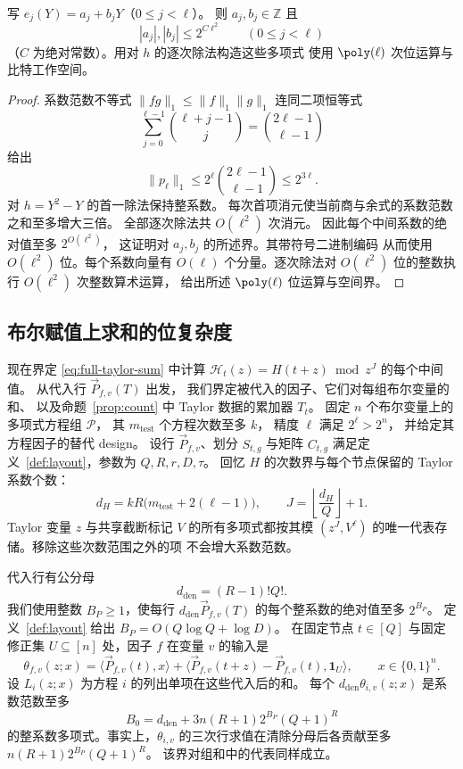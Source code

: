 \begin{lemma}\label{lem:rational-lift-height}
写 $e_j(Y)=a_j+b_jY$（$0\le j<\ell$）。
则 $a_j,b_j\in\mathbb Z$ 且
\[
 |a_j|,|b_j|\le2^{C\ell^2}\qquad(0\le j<\ell)
\]
（$C$ 为绝对常数）。用对 $h$ 的逐次除法构造这些多项式
使用 $\poly(\ell)$ 次位运算与比特工作空间。
\end{lemma}
\begin{proof}
系数范数不等式 $\|fg\|_1\le\|f\|_1\|g\|_1$
连同二项恒等式
\[
 \sum_{j=0}^{\ell-1}\binom{\ell+j-1}{j}
 =\binom{2\ell-1}{\ell-1}
\]
给出
\[
 \|p_\ell\|_1\le2^\ell\binom{2\ell-1}{\ell-1}\le2^{3\ell}.
\]
对 $h=Y^2-Y$ 的首一除法保持整系数。
每次首项消元使当前商与余式的系数范数之和至多增大三倍。
全部逐次除法共 $O(\ell^2)$ 次消元。
因此每个中间系数的绝对值至多 $2^{O(\ell^2)}$，
这证明对 $a_j,b_j$ 的所述界。其带符号二进制编码
从而使用 $O(\ell^2)$ 位。每个系数向量有 $O(\ell)$
个分量。逐次除法对 $O(\ell^2)$ 位的整数执行
$O(\ell^2)$ 次整数算术运算，
给出所述 $\poly(\ell)$ 位运算与空间界。
\end{proof}

\subsection{布尔赋值上求和的位复杂度}
\label{subsec:rational-streaming-height}
现在界定 \eqref{eq:full-taylor-sum} 中计算
$\mathcal H_t(z)=H(t+z)\bmod z^J$ 的每个中间值。
从代入行 $\vec{P}_{f,v}(T)$ 出发，
我们界定被代入的因子、它们对每组布尔变量的和、
以及命题~\ref{prop:count} 中 Taylor 数据的累加器
$T_t$。
固定 $n$ 个布尔变量上的多项式方程组 $\mathcal P$，
其 $m_{\mathrm{test}}$ 个方程次数至多 $k$，
精度 $\ell$ 满足 $2^\ell>2^n$，
并给定其方程因子的替代 design。
设行 $\vec{P}_{f,v}$、划分 $S_{t,g}$ 与矩阵 $C_{t,g}$
满足定义~\ref{def:layout}，参数为 $Q,R,r,D,\tau$。
回忆 $H$ 的次数界与每个节点保留的 Taylor
系数个数：
\[
 d_H=kR\bigl(m_{\mathrm{test}}+2(\ell-1)\bigr),\qquad
 J=\left\lfloor\frac{d_H}{Q}\right\rfloor+1.
\]
Taylor 变量 $z$ 与共享截断标记 $V$
的所有多项式都按其模 $(z^J,V^\ell)$
的唯一代表存储。移除这些次数范围之外的项
不会增大系数范数。

代入行有公分母
\[
 d_{\mathrm{den}}=(R-1)!Q!.
\]
我们使用整数 $B_P\ge1$，使每行
$d_{\mathrm{den}}\vec{P}_{f,v}(T)$
的每个整系数的绝对值至多 $2^{B_P}$。
定义~\ref{def:layout} 给出
$B_P=O(Q\log Q+\log D)$。
在固定节点 $t\in[Q]$ 与固定修正集 $U\subseteq[n]$
处，因子 $f$ 在变量 $v$ 的输入是
\[
 \theta_{f,v}(z;x)=\langle \vec{P}_{f,v}(t), x\rangle+
       \bigl\langle \vec{P}_{f,v}(t+z)-\vec{P}_{f,v}(t),\mathbf1_U\bigr\rangle,
 \qquad x\in\{0,1\}^n.
\]
设 $L_i(z;x)$ 为方程 $i$ 的列出单项在这些代入后的和。
每个 $d_{\mathrm{den}}\theta_{i,v}(z;x)$
是系数范数至多
\[
 B_0=d_{\mathrm{den}}+3n(R+1)2^{B_P}(Q+1)^R
\]
的整系数多项式。事实上，$\theta_{i,v}$
的三次行求值在清除分母后各贡献至多
$n(R+1)2^{B_P}(Q+1)^R$。
该界对组和中的代表同样成立。

